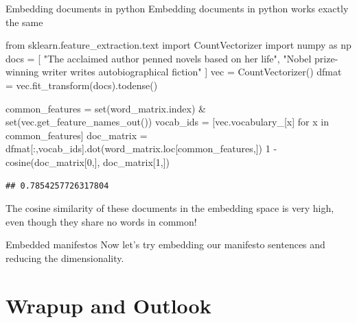 \documentclass[
  10pt,
  ignorenonframetext,
  aspectratio=169]{beamer}
\newenvironment{Shaded}{\begin{snugshade}}{\end{snugshade}}
\newcommand{\BuiltInTok}[1]{\textcolor[rgb]{0.80,0.80,0.80}{#1}}
\newcommand{\ControlFlowTok}[1]{\textcolor[rgb]{0.94,0.87,0.69}{#1}}
\newcommand{\DecValTok}[1]{\textcolor[rgb]{0.86,0.86,0.80}{#1}}
\newcommand{\ImportTok}[1]{\textcolor[rgb]{0.80,0.80,0.80}{#1}}
\newcommand{\KeywordTok}[1]{\textcolor[rgb]{0.94,0.87,0.69}{#1}}
\newcommand{\NormalTok}[1]{\textcolor[rgb]{0.80,0.80,0.80}{#1}}
\newcommand{\OperatorTok}[1]{\textcolor[rgb]{0.94,0.94,0.82}{#1}}
\newcommand{\StringTok}[1]{\textcolor[rgb]{0.80,0.58,0.58}{#1}}
\begin{document}
\begin{frame}[fragile]{Embedding documents in python}
\protect\hypertarget{embedding-documents-in-python}{}
Embedding documents in python works exactly the same

\medskip

\scriptsize

\begin{Shaded}
\begin{Highlighting}[]
\ImportTok{from}\NormalTok{ sklearn.feature\_extraction.text }\ImportTok{import}\NormalTok{ CountVectorizer}
\ImportTok{import}\NormalTok{ numpy }\ImportTok{as}\NormalTok{ np}
\NormalTok{docs }\OperatorTok{=}\NormalTok{ [}
  \StringTok{"The acclaimed author penned novels based on her life"}\NormalTok{,}
  \StringTok{"Nobel prize{-}winning writer writes autobiographical fiction"}
\NormalTok{]}
\NormalTok{vec }\OperatorTok{=}\NormalTok{ CountVectorizer()}
\NormalTok{dfmat }\OperatorTok{=}\NormalTok{ vec.fit\_transform(docs).todense()}

\NormalTok{common\_features }\OperatorTok{=} \BuiltInTok{set}\NormalTok{(word\_matrix.index) }\OperatorTok{\&} \BuiltInTok{set}\NormalTok{(vec.get\_feature\_names\_out())}
\NormalTok{vocab\_ids }\OperatorTok{=}\NormalTok{ [vec.vocabulary\_[x] }\ControlFlowTok{for}\NormalTok{ x }\KeywordTok{in}\NormalTok{ common\_features]}
\NormalTok{doc\_matrix }\OperatorTok{=}\NormalTok{ dfmat[:,vocab\_ids].dot(word\_matrix.loc[common\_features,])}
\DecValTok{1} \OperatorTok{{-}}\NormalTok{ cosine(doc\_matrix[}\DecValTok{0}\NormalTok{,], doc\_matrix[}\DecValTok{1}\NormalTok{,])}
\end{Highlighting}
\end{Shaded}

\begin{verbatim}
## 0.7854257726317804
\end{verbatim}

\medskip

\normalsize

The cosine similarity of these documents in the embedding space is very
high, even though they share no words in common!
\end{frame}

\begin{frame}{Embedded manifestos}
\protect\hypertarget{embedded-manifestos}{}
Now let's try embedding our manifesto sentences and reducing the
dimensionality.
\end{frame}

\hypertarget{wrapup-and-outlook}{%
\section{Wrapup and Outlook}\label{wrapup-and-outlook}}
\end{document}
